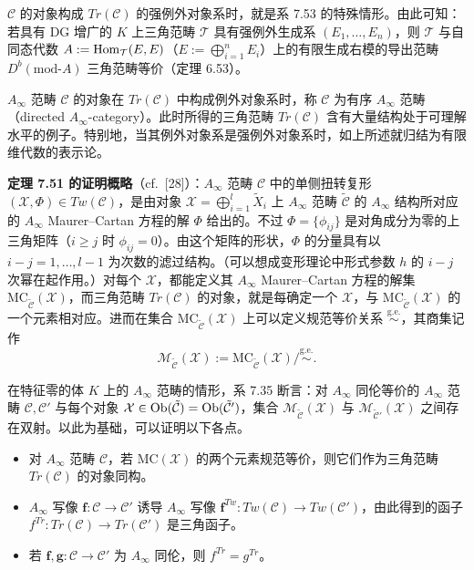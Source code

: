 
$\mathcal C$ 的对象构成 $Tr(\mathcal C)$ 的强例外对象系时，就是系 7.53 的特殊情形。由此可知：若具有 DG 增广的 $K$ 上三角范畴 $\mathcal T$ 具有强例外生成系 $(E_{1},\dots,E_{n})$，则 $\mathcal T$ 与自同态代数 $A:=\operatorname{Hom}_{\mathcal T}(E,E)$（$E:=\bigoplus_{i=1}^{n}E_{i}$）上的有限生成右模的导出范畴 $D^{b}(\mathrm{mod}\text{-}A)$ 三角范畴等价（定理 6.53）。

$A_\infty$ 范畴 $\mathcal C$ 的对象在 $Tr(\mathcal C)$ 中构成例外对象系时，称 $\mathcal C$ 为有序 $A_\infty$ 范畴（directed $A_\infty$-category）。此时所得的三角范畴 $Tr(\mathcal C)$ 含有大量结构处于可理解水平的例子。特别地，当其例外对象系是强例外对象系时，如上所述就归结为有限维代数的表示论。

\textbf{定理 7.51 的证明概略}（cf.\ [28]）：$A_\infty$ 范畴 $\mathcal C$ 中的单侧扭转复形 $(\mathcal X,\Phi)\in Tw(\mathcal C)$，是由对象 $\mathcal X=\bigoplus_{i=1}^{l}\tilde X_{i}$ 上 $A_\infty$ 范畴 $\tilde{\mathcal C}$ 的 $A_\infty$ 结构所对应的 $A_\infty$ Maurer--Cartan 方程的解 $\Phi$ 给出的。不过 $\Phi=\{\phi_{ij}\}$ 是对角成分为零的上三角矩阵（$i\ge j$ 时 $\phi_{ij}=0$）。由这个矩阵的形状，$\Phi$ 的分量具有以 $i-j=1,\dots,l-1$ 为次数的滤过结构。（可以想成变形理论中形式参数 $h$ 的 $i-j$ 次幂在起作用。）对每个 $\mathcal X$，都能定义其 $A_\infty$ Maurer--Cartan 方程的解集 $\mathrm{MC}_{\tilde{\mathcal C}}(\mathcal X)$，而三角范畴 $Tr(\mathcal C)$ 的对象，就是每确定一个 $\mathcal X$，与 $\mathrm{MC}_{\tilde{\mathcal C}}(\mathcal X)$ 的一个元素相对应。进而在集合 $\mathrm{MC}_{\tilde{\mathcal C}}(\mathcal X)$ 上可以定义规范等价关系 $\overset{\mathrm{g.e.}}{\sim}$，其商集记作
\[
  \mathcal M_{\tilde{\mathcal C}}(\mathcal X):=\mathrm{MC}_{\tilde{\mathcal C}}(\mathcal X)\big/\overset{\mathrm{g.e.}}{\sim}.
\]

在特征零的体 $K$ 上的 $A_\infty$ 范畴的情形，系 7.35 断言：对 $A_\infty$ 同伦等价的 $A_\infty$ 范畴 $\mathcal C,\mathcal C'$ 与每个对象 $\mathcal X\in\operatorname{Ob}(\tilde{\mathcal C})=\operatorname{Ob}(\tilde{\mathcal C}')$，集合 $\mathcal M_{\tilde{\mathcal C}}(\mathcal X)$ 与 $\mathcal M_{\tilde{\mathcal C}'}(\mathcal X)$ 之间存在双射。以此为基础，可以证明以下各点。
\begin{itemize}[leftmargin=1.5em,itemsep=2pt,topsep=2pt]
  \item 对 $A_\infty$ 范畴 $\mathcal C$，若 $\mathrm{MC}(\mathcal X)$ 的两个元素规范等价，则它们作为三角范畴 $Tr(\mathcal C)$ 的对象同构。
  \item $A_\infty$ 写像 $\mathbf f\colon\mathcal C\to\mathcal C'$ 诱导 $A_\infty$ 写像 $\mathbf f^{Tw}\colon Tw(\mathcal C)\to Tw(\mathcal C')$，由此得到的函子 $f^{Tr}\colon Tr(\mathcal C)\to Tr(\mathcal C')$ 是三角函子。
  \item 若 $\mathbf f,\mathbf g\colon\mathcal C\to\mathcal C'$ 为 $A_\infty$ 同伦，则 $f^{Tr}=g^{Tr}$。
\end{itemize}


